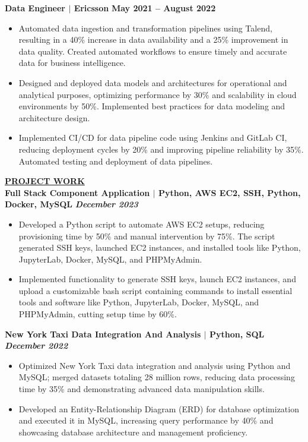 \documentclass{article}
\begin{document}
\noindent \textbf{Data Engineer $\mid$ Ericsson} \hfill \textbf{May 2021 – August 2022}
\begin{itemize}[noitemsep,nolistsep,leftmargin=*]
\item {\small Automated data ingestion and transformation pipelines using Talend, resulting in a 40\% increase in data availability and a 25\% improvement in data quality. Created automated workflows to ensure timely and accurate data for business intelligence.}
\item {\small Designed and deployed data models and architectures for operational and analytical purposes, optimizing performance by 30\% and scalability in cloud environments by 50\%. Implemented best practices for data modeling and architecture design.}
\item {\small Implemented CI/CD for data pipeline code using Jenkins and GitLab CI, reducing deployment cycles by 20\% and improving pipeline reliability by 35\%. Automated testing and deployment of data pipelines.}
\end{itemize}





\vspace{3mm}
\noindent \textbf{\underline{PROJECT WORK}}\\
\noindent \textbf{Full Stack Component Application $\mid$ Python, AWS EC2, SSH, Python, Docker, MySQL} \textit{\hfill \textbf{December 2023}}
\begin{itemize}[noitemsep,nolistsep,leftmargin=*]
\item {\small Developed a Python script to automate AWS EC2 setups, reducing provisioning time by 50\% and manual intervention by 75\%. The script generated SSH keys, launched EC2 instances, and installed tools like Python, JupyterLab, Docker, MySQL, and PHPMyAdmin.}
\item {\small Implemented functionality to generate SSH keys, launch EC2 instances, and upload a customizable bash script containing commands to install essential tools and software like Python, JupyterLab, Docker, MySQL, and PHPMyAdmin, cutting setup time by 60\%.}
\end{itemize}
\vspace{1mm}

\noindent \textbf{New York Taxi Data Integration And Analysis $\mid$ Python, SQL} \textit{\hfill \textbf{December 2022}}
\begin{itemize}[noitemsep,nolistsep,leftmargin=*]
\item {\small Optimized New York Taxi data integration and analysis using Python and MySQL; merged datasets totaling 28 million rows, reducing data processing time by 35\% and demonstrating advanced data manipulation skills.}
\item {\small Developed an Entity-Relationship Diagram (ERD) for database optimization and executed it in MySQL, increasing query performance by 40\% and showcasing database architecture and management proficiency.}
\end{itemize}
\vspace{1mm}
\end{document}

